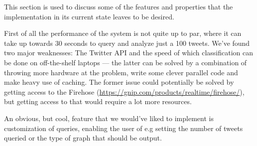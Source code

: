 \documentclass[Main]{subfiles}
\begin{document}



    


This section is used to discuss some of the features and properties that the implementation in its current state leaves to be desired.

First of all the performance of the system is not quite up to par, where it can take up towards 30 seconds to query and analyze just a 100 tweets.
We've found two major weaknesses: The Twitter API and the speed of which classification can be done on off-the-shelf laptops 
--- the latter can be solved by a combination of throwing more hardware at the problem, write some clever parallel code and make heavy use of caching.
The former issue could potentially be solved by getting access to the Firehose (\url{https://gnip.com/products/realtime/firehose/}),
but getting access to that would require a lot more resources.

An obvious, but cool, feature that we would've liked to implement is customization of queries, enabling the user of e.g setting the number of tweets queried or the type of graph that should be output.
\end{document}
